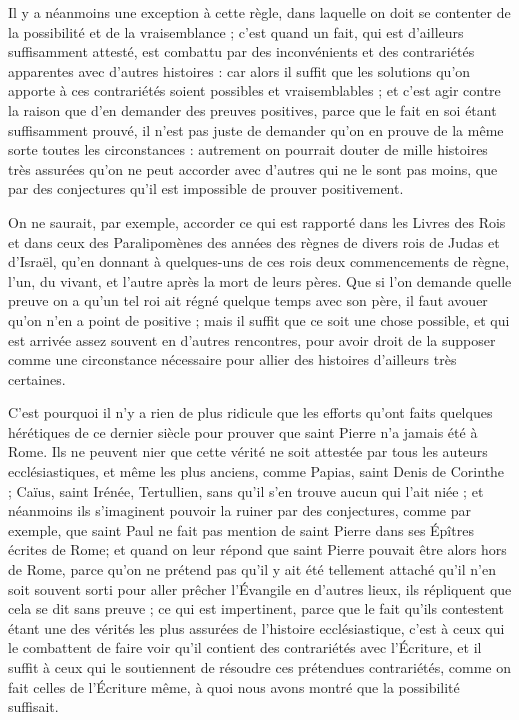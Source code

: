 Il y a néanmoins une exception à cette règle, dans laquelle on doit se contenter de la possibilité et de la vraisemblance ; c'est quand un fait, qui est d'ailleurs suffisamment attesté, est combattu par des inconvénients et des contrariétés apparentes avec d'autres histoires : car alors il suffit que les solutions qu'on apporte à ces contrariétés soient possibles et vraisemblables ; et c'est agir contre la raison que d'en demander des preuves positives, parce que le fait en soi étant suffisamment prouvé, il n'est pas juste de demander qu'on en prouve de la même sorte toutes les circonstances : autrement on pourrait douter de mille histoires très assurées qu'on ne peut accorder avec d'autres qui ne le sont pas moins, que par des conjectures qu'il est impossible de prouver positivement.

On ne saurait, par exemple, accorder ce qui est rapporté dans les Livres des Rois et dans ceux des Paralipomènes des années des règnes de divers rois de Judas et d'Israël, qu'en donnant à quelques-uns de ces rois deux commencements de règne, l'un, du vivant, et l'autre après la mort de leurs pères. Que si l'on demande quelle preuve on a qu'un tel roi ait régné quelque temps avec son père, il faut avouer qu'on n'en a point de positive ; mais il suffit que ce soit une chose possible, et qui est arrivée assez souvent en d'autres rencontres, pour avoir droit de la supposer comme une circonstance nécessaire pour allier des histoires d'ailleurs très certaines.

C'est pourquoi il n'y a rien de plus ridicule que les efforts qu'ont faits quelques hérétiques de ce dernier siècle pour prouver que saint Pierre n'a jamais été à Rome. Ils ne peuvent nier que cette vérité ne soit attestée par tous les auteurs ecclésiastiques, et même les plus anciens, comme Papias, saint Denis de Corinthe ; Caïus, saint Irénée, Tertullien, sans qu'il s'en trouve aucun qui l'ait niée ; et néanmoins ils s'imaginent pouvoir la ruiner par des conjectures, comme par exemple, que saint Paul ne fait pas mention de saint Pierre dans ses Épîtres écrites de Rome; et quand on leur répond que saint Pierre pouvait être alors hors de Rome, parce qu'on ne prétend pas qu'il y ait été tellement attaché qu'il n'en soit souvent sorti pour aller prêcher l'Évangile en d'autres lieux, ils répliquent que cela se dit sans preuve ; ce qui est impertinent, parce que le fait qu'ils contestent étant une des vérités les plus assurées de l'histoire ecclésiastique, c'est à ceux qui le combattent de faire voir qu'il contient des contrariétés avec l'Écriture, et il suffit à ceux qui le soutiennent de résoudre ces prétendues contrariétés, comme on fait celles de l'Écriture même, à quoi nous avons montré que la possibilité suffisait.



